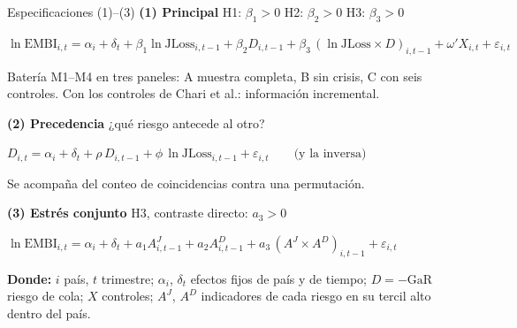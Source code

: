 \documentclass[aspectratio=169]{beamer}
\newcommand{\JLoss}{\mathrm{JLoss}}
\newcommand{\GaR}{\mathrm{GaR}}
\newcommand{\EMBI}{\mathrm{EMBI}}
\newcommand{\ecu}[1]{\par\vspace{2pt}\centerline{\small$\displaystyle #1$}\vspace{2pt}}
\begin{document}
\begin{frame}{Especificaciones (1)--(3)}
\footnotesize
\textbf{(1) Principal} \hfill H1: $\beta_1>0$ \quad H2: $\beta_2>0$ \quad H3: $\beta_3>0$
\ecu{\ln\EMBI_{i,t}=\alpha_i+\delta_t+\beta_1\ln\JLoss_{i,t-1}+\beta_2D_{i,t-1}+\beta_3\,(\ln\JLoss\times D)_{i,t-1}+\omega'X_{i,t}+\varepsilon_{i,t}}
{\scriptsize Batería M1--M4 en tres paneles: A muestra completa, B sin crisis, C con seis controles. Con los controles de Chari et al.: información incremental.\par}
\vspace{5pt}
\textbf{(2) Precedencia} \hfill ¿qué riesgo antecede al otro?
\ecu{D_{i,t}=\alpha_i+\delta_t+\rho\,D_{i,t-1}+\phi\,\ln\JLoss_{i,t-1}+\varepsilon_{i,t}\qquad\text{(y la inversa)}}
{\scriptsize Se acompaña del conteo de coincidencias contra una permutación.\par}
\vspace{5pt}
\textbf{(3) Estrés conjunto} \hfill H3, contraste directo: $a_3>0$
\ecu{\ln\EMBI_{i,t}=\alpha_i+\delta_t+a_1A^{J}_{i,t-1}+a_2A^{D}_{i,t-1}+a_3\,(A^{J}\times A^{D})_{i,t-1}+\varepsilon_{i,t}}
{\scriptsize\textbf{Donde:} $i$ país, $t$ trimestre; $\alpha_i$, $\delta_t$ efectos fijos de país y de tiempo; $D=-\GaR$ riesgo de cola; $X$ controles; $A^{J}$, $A^{D}$ indicadores de cada riesgo en su tercil alto dentro del país.\par}
\end{frame}
\end{document}
